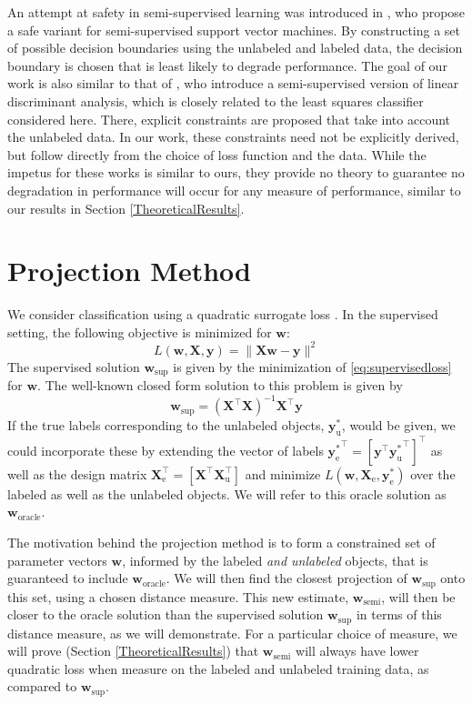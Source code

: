 \documentclass{article}
\newcommand{\Xe}{\vec{X}_\mathrm{e}  }
\renewcommand{\vec}[1]{\mathbf{#1}}
\begin{document}
An attempt at safety in semi-supervised learning was introduced in \citep{Li2011}, who propose a safe variant for semi-supervised support vector machines. By constructing a set of possible decision boundaries using the unlabeled and labeled data, the decision boundary is chosen that is least likely to degrade performance. The goal of our work is also similar to that of \citep{Loog2010,Loog2014a}, who introduce a semi-supervised version of linear discriminant analysis, which is closely related to the least squares classifier considered here. There, explicit constraints are proposed that take into account the unlabeled data. In our work, these constraints need not be explicitly derived, but follow  directly from the choice of loss function and the data. While the impetus for these works is similar to ours, they provide no theory to guarantee no degradation in performance will occur for any measure of performance, similar to our results in Section \ref{TheoreticalResults}.

\section{Projection Method}
\label{section:projections}
We consider classification using a quadratic surrogate loss \citep{Hastie2001}. In the supervised setting, the following objective is minimized for $\vec{w}$:
\begin{equation}
\label{eq:supervisedloss}
L(\vec{w},\vec{X},\vec{y}) = \lVert \vec{X} \vec{w} - \vec{y} \rVert^2
\end{equation}
The supervised solution $\vec{w}_{\text{sup}}$ is given by the minimization of \eqref{eq:supervisedloss} for $\vec{w}$. The well-known closed form solution to this problem is given by
\begin{equation}
\label{eq:supervisedsolution}
\vec{w}_{\text{sup}} = (\vec{X}^\top \vec{X})^{-1} \vec{X}^\top \vec{y}
\end{equation}
If the true labels corresponding to the unlabeled objects, $\vec{y}_\text{u}^{\ast}$, would be given, we could incorporate these by extending the vector of labels ${\vec{y}_\text{e}^\ast}^\top = \left[ \vec{y}^\top {\vec{y}_\text{u}^\ast}^\top \right]^\top$ as well as the design matrix $\vec{X}_\text{e}^\top = \left[ \vec{X}^\top \vec{X}_\text{u}^\top \right]$ and minimize $L(\vec{w},\Xe, \vec{y}_\text{e}^\ast)$ over the labeled as well as the unlabeled objects. We will refer to this oracle solution as $\vec{w}_\text{oracle}$. 

The motivation behind the projection method is to form a constrained set of parameter vectors $\vec{w}$, informed by the labeled \emph{and unlabeled} objects, that is guaranteed to include $\vec{w}_\text{oracle}$. We will then find the closest projection of $\vec{w}_{\text{sup}}$ onto this set, using a chosen distance measure. This new estimate, $\vec{w}_{\text{semi}}$, will then be closer to the oracle solution than the supervised solution $\vec{w}_{\text{sup}}$ in terms of this distance measure, as we will demonstrate. For a particular choice of measure, we will prove (Section \ref{TheoreticalResults})  that $\vec{w}_{\text{semi}}$ will always have lower quadratic loss when measure on the labeled and unlabeled training data, as compared to $\vec{w}_{\text{sup}}$.
\end{document}
